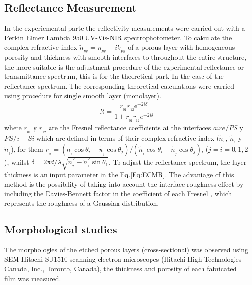 \documentclass{article}
\begin{document}
\subsection{Reflectance Measurement}
In the experiemental parte the reflectivity measurements were carried
out with a Perkin Elmer Lambda 950 UV-Vis-NIR spectrophotometer. To
calculate the complex refractive index $ \tilde{n}_{_{PS}} = n_{_
  {PS}} - ik_{_{PS}} $ of a porous layer with homogeneous porosity
and thickness with smooth interfaces to throughout the entire
structure, the more suitable is the adjustment procedure of the
experimental reflectance or transmittance spectrum, this is for the
theoretical part. In the case of the reflectance spectrum. The
corresponding theoretical calculations were carried using procedure
for single  smooth layer (monolayer).
 \begin{eqnarray}\label{Eq:ECMR}
R=\dfrac{r _ {_ {01}}r _ {_ {12}} e^{-2i\delta}}{1+r _ {_ {01}}r _ {_ {12}} e^{-2i\delta}}
\end{eqnarray}
where $ r_{_ {01}} $ y $ r_{_ {12}} $ are the Fresnel reflectance
coefficients at the interfaces $aire/PS$ y $PS/c-Si$ which are
defined in terms of their complex refractive index ($\tilde{n}_{_ {1}}
$, $\tilde{n}_{_ {2}} $ y $ \tilde{n}_{_ {3}} $), for them
$r_{_{ij}}=(\tilde{n}_{_{i}}\cos\theta_i-\tilde{n}_{_{j}}\cos\theta_j)/(\tilde{n}_{_{i}}\cos\theta_i+\tilde{n}_{_{j}}\cos\theta_j)$,
($j=i=0,1,2$), whilst $\delta=2\pi
d/\lambda\sqrt{\tilde{n}^2_{_{2}}-\tilde{n}^2_{_{1}}\sin \theta_1}$.
 To adjust the reflectance spectrum, the layer thickness is an input
 parameter in the Eq.\ref{Eq:ECMR}. The advantage of this method is
 the possibility of taking into account the interface roughness effect
 by including the Davies-Bennett factor in the coefficient of each
 Fresnel \cite{I17, I18, I19}, which represents the roughness of a
 Gaussian distribution.
\subsection{Morphological studies}
The morphologies of the etched porous layers (cross-sectional) was
observed using SEM Hitachi SU1510 scanning electron microscopes
(Hitachi High Technologies Canada, Inc., Toronto, Canada), the
thickness  and porosity  of each fabricated  film was measured.
\end{document}
